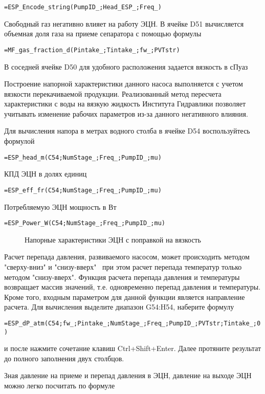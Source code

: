 { \small  \texttt{=ESP\_Encode\_string(PumpID\_;Head\_ESP\_;Freq\_)}}

Свободный газ негативно влияет на работу ЭЦН. В ячейке D51 вычисляется объемная доля газа на приеме сепаратора с помощью формулы

{ \small  \texttt{=MF\_gas\_fraction\_d(Pintake\_;Tintake\_;fw\_;PVTstr)}}
 
В соседней ячейке D50 для удобного расположения задается вязкость в сПуаз

Построение напорной характеристики данного насоса выполняется с учетом вязкости перекачиваемой продукции. Реализованный метод пересчета характеристики с воды на вязкую жидкость Института Гидравлики позволяет учитывать изменение рабочих параметров из-за данного негативного влияния.

Для вычисления напора в метрах водного столба в ячейке D54 воспользуйтесь формулой

{ \small  \texttt{=ESP\_head\_m(C54;NumStage\_;Freq\_;PumpID\_;mu)}}

КПД ЭЦН в долях единиц 

{ \small  \texttt{=ESP\_eff\_fr(C54;NumStage\_;Freq\_;PumpID\_;mu)}}

Потребляемую ЭЦН мощность в Вт

{ \small  \texttt{=ESP\_Power\_W(C54;NumStage\_;Freq\_;PumpID\_;mu)}}

\begin{figure}[h!]
	\center{\texttt{[image: Ex70\_3]}}
	\caption{Напорные характеристики ЭЦН с поправкой на вязкость}
	\label{ris:Ex70_3}
\end{figure}

Расчет перепада давления, развиваемого насосом, может происходить методом "сверху-вниз" и "снизу-вверх" \, при этом расчет перепада температур только методом "снизу-вверх". Функция расчета перепада давления и температуры возвращает массив значений, т.е. одновременно перепад давления и температуры. Кроме того, входным параметром для данной функции является направление расчета. Для вычисления выделите диапазон G54:H54, наберите формулу

{ \small  \texttt{=ESP\_dP\_atm(C54;fw\_;Pintake\_;NumStage\_;Freq\_;PumpID\_;PVTstr;Tintake\_;0)}}

и после нажмите сочетание клавиш  Ctrl+Shift+Enter. Далее протяните результат до полного заполнения двух столбцов.

Зная давление на приеме и перепад давления в ЭЦН, давление на выходе ЭЦН можно легко посчитать по формуле

